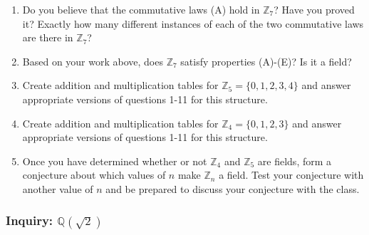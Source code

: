 \documentclass[11pt]{article}
\theoremstyle{definition}
\begin{document}
\begin{enumerate}
        \vspace{1.5in}

      \item Do you believe that the commutative laws (A) hold in $\mathbb{Z}_7$? Have you proved it? Exactly how many different 
        instances of each of the two commutative laws are there in $\mathbb{Z}_7$?

        \vspace{1.5in}

      \item Based on your work above, does $\mathbb{Z}_7$ satisfy properties (A)-(E)? Is it a field?

        \vspace{1.5in}

        \newpage 
      \item Create addition and multiplication tables for $\mathbb{Z}_5 = \{0,1,2,3,4\}$ and answer
        appropriate versions of questions 1-11 for this structure. 

        \newpage
      \item Create addition and multiplication tables for $\mathbb{Z}_4 = \{0,1,2,3\}$ and answer
        appropriate versions of questions 1-11 for this structure. 
        \newpage


      \item Once you have determined whether or not $\mathbb{Z}_4$ and $\mathbb{Z}_5$ are fields, form a conjecture about which values of $n$ make
        $\mathbb{Z}_n$ a field. Test your conjecture with another value of $n$ and be prepared to discuss your conjecture with the class.

        \newpage
    \end{enumerate}

    \newpage \subsubsection{Inquiry: $\mathbb{Q}(\sqrt{2})$}
\end{document}
